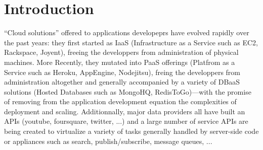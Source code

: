 
\section{Introduction}

%
%

``Cloud solutions'' offered to applications developeprs have evolved
rapidly over the past years: they first started as IaaS
(Infrastructure as a Service such as EC2, Rackspace, Joyent), freeing
the developpers from administration of physical machines. More
Recently, they mutated into PaaS offerings (Platfrom as a Service such
as Heroku, AppEngine, Nodejitsu), freing the developpers from
administration altogether and generally accompanied by a variety of
DBaaS solutions (Hosted Databases such as MongoHQ, RedisToGo)---with
the promise of removing from the application development equation the
complexities of deployment and scaling. Additionnally, major data
providers all have built an APIs (youtube, foursquare, twitter, ...)
and a large number of service APIs are being created to virtualize a
variety of tasks generally handled by server-side code or appliances
such as search, publish/subscribe, message queues, ... 


